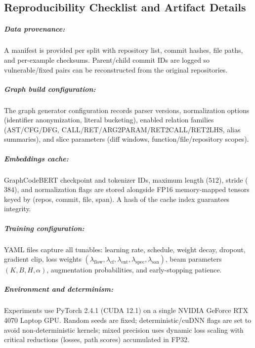 \documentclass{buthesis}
\begin{document}
\begin{appendices}
\chapter{Reproducibility Checklist and Artifact Details}

\paragraph{Data provenance:}
A manifest is provided per split with repository list, commit hashes, file paths,
and per-example checksums. Parent/child commit IDs are logged so vulnerable/fixed
pairs can be reconstructed from the original repositories.

\paragraph{Graph build configuration:}
The graph generator configuration records parser versions, normalization options
(identifier anonymization, literal bucketing), enabled relation families (AST/CFG/DFG,
CALL/RET/ARG2PARAM/RET2CALL/RET2LHS, alias summaries), and slice parameters
(diff windows, function/file/repository scopes).

\paragraph{Embeddings cache:}
GraphCodeBERT checkpoint and tokenizer IDs, maximum length ($512$), stride ($384$),
and normalization flags are stored alongside FP16 memory-mapped tensors keyed by
(repos, commit, file, span). A hash of the cache index guarantees integrity.

\paragraph{Training configuration:}
YAML files capture all tunables: learning rate, schedule, weight decay, dropout,
gradient clip, loss weights $(\lambda_{\text{flow}},\lambda_{\text{cf}},\lambda_{\text{ent}},
\lambda_{\text{spec}},\lambda_{\text{san}})$, beam parameters $(K,B,H,\alpha)$,
augmentation probabilities, and early-stopping patience.

\paragraph{Environment and determinism:}
Experiments use PyTorch 2.4.1 (CUDA 12.1) on a single NVIDIA GeForce RTX 4070
Laptop GPU. Random seeds are fixed; deterministic/cuDNN flags are set to avoid
non-deterministic kernels; mixed precision uses dynamic loss scaling with critical
reductions (losses, path scores) accumulated in FP32.


\end{appendices}
\end{document}
